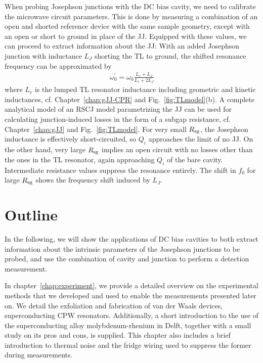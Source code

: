 When probing Josephson junctions with the DC bias cavity, we need to calibrate the microwave circuit parameters.
%
This is done by measuring a combination of an open and shorted reference device with the same sample geometry, except with an open or short to ground in place of the JJ.
%
Equipped with these values, we can proceed to extract information about the JJ:
%
With an added Josephson junction with inductance $L_J$ shorting the TL to ground, the shifted resonance frequency can be approximated by
%
\begin{align}
\omega_0^\prime = \omega_0\frac{L_r+L_J}{L_r+2L_J}
\label{eq:intro-omega0p}
\end{align}
%
where $L_r$ is the lumped TL resonator inductance including geometric and kinetic inductances, cf. Chapter~\ref{chap:gJJ-CPR} and Fig.~\ref{fig:TLmodel}(b).
%
A complete analytical model of an RSCJ model parametrizing the JJ can be used for calculating junction-induced losses in the form of a subgap resistance, cf. Chapter~\ref{chap:gJJ} and Fig.~\ref{fig:TLmodel}.
%
For very small $R_{\rm sg}$, the Josephson inductance is effectively short-circuited, so $Q_i$ approaches the limit of no JJ.
%
On the other hand, very large $R_{\rm sg}$ implies an open circuit with no losses other than the ones in the TL resonator, again approaching $Q_i$ of the bare cavity.
%
Intermediate resistance values suppress the resonance entirely.
%
The shift in $f_0$ for large $R_{\rm sg}$ shows the frequency shift induced by $L_J$.



\section{Outline}

In the following, we will show the applications of DC bias cavities to both extract information about the intrinsic parameters of the Josephson junctions to be probed, and use the combination of cavity and junction to perform a detection measurement.


In chapter~\ref{chap:experiment}, we provide a detailed overview on the experimental methods that we developed and used to enable the measurements presented later on.
%
We detail the exfoliation and fabrication of van der Waals devices, superconducting CPW resonators.
%
Additionally, a short introduction to the use of the superconducting alloy molybdenum-rhenium in Delft, together with a small study on its pros and cons, is supplied.
%
This chapter also includes a brief introduction to thermal noise and the fridge wiring used to suppress the former during measurements.

